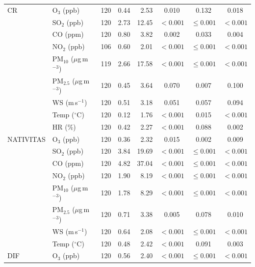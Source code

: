 \begin{longtable}{@{}llrrrccc@{}}
CR        & O$_3$ (ppb)                      & 120 & 0.44 & 2.53  & 0.010    & 0.132       & 0.018 \\
          & SO$_2$ (ppb)                     & 120 & 2.73 & 12.45 & $<0.001$ & $\leq0.001$ & $<0.001$ \\
          & CO (ppm)                         & 120 & 0.80 & 3.82  & 0.002    & 0.033       & 0.004 \\
          & NO$_2$ (ppb)                     & 106 & 0.60 & 2.01  & $<0.001$ & $\leq0.001$ & $<0.001$ \\
          & PM$_{10}$ ($\mu$g\,m$^{-3}$)     & 119 & 2.66 & 17.58 & $<0.001$ & $\leq0.001$ & $<0.001$ \\
          & PM$_{2.5}$ ($\mu$g\,m$^{-3}$)    & 120 & 0.45 & 3.64  & 0.070    & 0.007       & 0.100 \\
          & WS (m\,s$^{-1}$)                 & 120 & 0.51 & 3.18  & 0.051    & 0.057       & 0.094 \\
          & Temp ($^{\circ}$C)               & 120 & 0.12 & 1.76  & $<0.001$ & 0.015       & $<0.001$ \\
          & HR (\%)                          & 120 & 0.42 & 2.27  & $<0.001$ & 0.088       & 0.002 \\
\midrule
NATIVITAS & O$_3$ (ppb)                      & 120 & 0.36 & 2.32  & 0.015    & 0.002       & 0.009 \\
          & SO$_2$ (ppb)                     & 120 & 3.84 & 19.69 & $<0.001$ & $\leq0.001$ & $<0.001$ \\
          & CO (ppm)                         & 120 & 4.82 & 37.04 & $<0.001$ & $\leq0.001$ & $<0.001$ \\
          & NO$_2$ (ppb)                     & 120 & 1.90 & 8.19  & $<0.001$ & $\leq0.001$ & $<0.001$ \\
          & PM$_{10}$ ($\mu$g\,m$^{-3}$)     & 120 & 1.78 & 8.29  & $<0.001$ & $\leq0.001$ & $<0.001$ \\
          & PM$_{2.5}$ ($\mu$g\,m$^{-3}$)    & 120 & 0.71 & 3.38  & 0.005    & 0.078       & 0.010 \\
          & WS (m\,s$^{-1}$)                 & 120 & 0.64 & 2.08  & $<0.001$ & $\leq0.001$ & $<0.001$ \\
          & Temp ($^{\circ}$C)               & 120 & 0.48 & 2.42  & $<0.001$ & 0.091       & 0.003 \\
\midrule
DIF       & O$_3$ (ppb)                      & 120 & 0.56 & 2.40  & $<0.001$ & $\leq0.001$ & $<0.001$ \\

\end{longtable}
